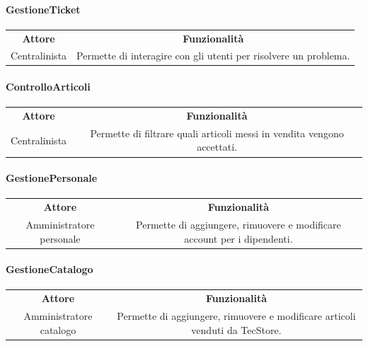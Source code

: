 \documentclass[12pt]{article}
\begin{document}
\paragraph*{GestioneTicket}
\begin{center}
\begin{tabular}{|c|c|}
\rowcolor[gray]{0.8}
\hline
\textbf{Attore} & \textbf{Funzionalità} \\
Centralinista & Permette di interagire con gli utenti per risolvere un problema. \\
\hline
\end{tabular}
\end{center}

\paragraph*{ControlloArticoli}
\begin{center}
\begin{tabular}{|c|c|}
\rowcolor[gray]{0.8}
\hline
\textbf{Attore} & \textbf{Funzionalità} \\
Centralinista & Permette di filtrare quali articoli messi in vendita vengono accettati. \\
\hline
\end{tabular}
\end{center}

\paragraph*{GestionePersonale}
\begin{center}
\begin{tabular}{|c|c|}
\rowcolor[gray]{0.8}
\hline
\textbf{Attore} & \textbf{Funzionalità} \\
Amministratore personale & Permette di aggiungere, rimuovere e modificare account per i dipendenti. \\
\hline
\end{tabular}
\end{center}

\paragraph*{GestioneCatalogo}
\begin{center}
\begin{tabular}{|c|c|}
\rowcolor[gray]{0.8}
\hline
\textbf{Attore} & \textbf{Funzionalità} \\
Amministratore catalogo & Permette di aggiungere, rimuovere e modificare articoli venduti da TecStore. \\
\hline
\end{tabular}
\end{center}
\end{document}
